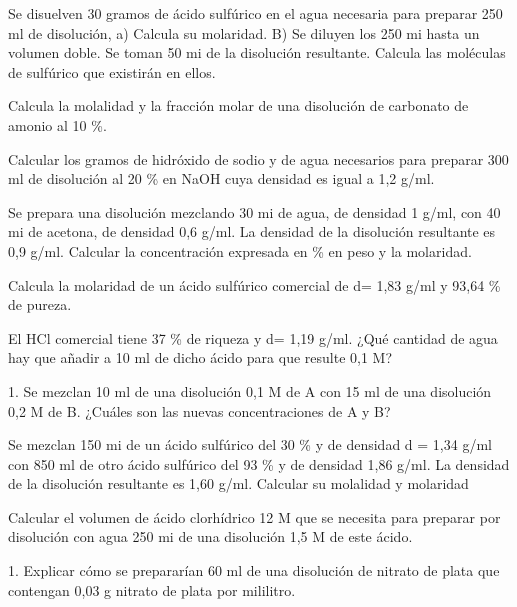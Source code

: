 \begin{problem}
Se disuelven 30 gramos de ácido sulfúrico en el agua necesaria para preparar 250 ml de disolución, a) Calcula su molaridad. B) Se diluyen los 250 mi hasta un volumen doble. Se toman 50 mi de la disolución resultante. Calcula las moléculas de sulfúrico que existirán en ellos.	
\end{problem}
\begin{problem}
Calcula la molalidad y la fracción molar de una disolución de carbonato de amonio al 10 \%.
\end{problem}
\begin{problem}
Calcular los gramos de hidróxido de sodio y de agua necesarios para preparar 300 ml de disolución al 20 \% en NaOH cuya densidad es igual a 1,2 g/ml.	
\end{problem}
\begin{problem}
Se prepara una disolución mezclando 30 mi de agua, de densidad 1 g/ml, con 40 mi de acetona, de densidad 0,6 g/ml. La densidad de la disolución resultante es 0,9 g/ml. Calcular la concentración expresada en \% en peso y la molaridad.
\end{problem}
\begin{problem}
Calcula la molaridad de un ácido sulfúrico comercial de d= 1,83 g/ml y 93,64 \% de pureza.
\end{problem}
\begin{problem}
El HCl comercial tiene 37 \% de riqueza y d= 1,19 g/ml. ¿Qué cantidad de agua hay que añadir a 10 ml de dicho ácido para que resulte 0,1 M?
\end{problem}
\begin{problem}
1.	Se mezclan 10 ml de una disolución 0,1 M de A con 15 ml de una disolución 0,2 M de B. ¿Cuáles son las nuevas concentraciones de A y B?	
\end{problem}
\begin{problem}
Se mezclan 150 mi de un ácido sulfúrico del 30 \% y de densidad d = 1,34 g/ml con 850 ml de otro ácido sulfúrico del 93 \% y de densidad 1,86 g/ml. La densidad de la disolución resultante es 1,60 g/ml. Calcular su molalidad y molaridad	
\end{problem}
\begin{problem}
Calcular el volumen de ácido clorhídrico 12 M que se necesita para preparar por disolución con agua 250 mi de una disolución 1,5 M de este ácido.
\end{problem}
\begin{problem}
1.	Explicar cómo se prepararían 60 ml de una disolución de nitrato de plata que contengan 0,03 g nitrato de plata por mililitro.
\end{problem}
